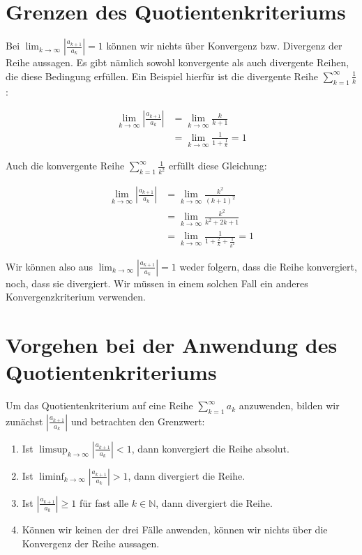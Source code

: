 \documentclass[fontsize=9pt,
               parskip=half-,
               DIV=14,
               listof=chapterentry,
               tocflat]{scrbook}
\begin{document}
\section{Grenzen des Quotientenkriteriums}

Bei $\lim _{k\to \infty }\left|{\tfrac {a_{k+1}}{a_{k}}}\right|=1$ können wir nichts über Konvergenz bzw. Divergenz der Reihe aussagen. Es gibt nämlich sowohl konvergente als auch divergente Reihen, die diese Bedingung erfüllen. Ein Beispiel hierfür ist die divergente Reihe $\sum _{k=1}^{\infty }{\frac {1}{k}}$:

\begin{align*}
\lim _{k\to \infty }\left|{\frac {a_{k+1}}{a_{k}}}\right|&=\lim _{k\to \infty }{\frac {k}{k+1}}\\[0.5em]&=\lim _{k\to \infty }{\frac {1}{1+{\frac {1}{k}}}}=1
\end{align*}

Auch die konvergente Reihe $\sum _{k=1}^{\infty }{\frac {1}{k^{2}}}$ erfüllt diese Gleichung:

\begin{align*}
\lim _{k\to \infty }\left|{\frac {a_{k+1}}{a_{k}}}\right|&=\lim _{k\to \infty }{\frac {k^{2}}{(k+1)^{2}}}\\[0.5em]&=\lim _{k\to \infty }{\frac {k^{2}}{k^{2}+2k+1}}\\[0.5em]&=\lim _{k\to \infty }{\frac {1}{1+{\frac {2}{k}}+{\frac {1}{k^{2}}}}}=1
\end{align*}

Wir können also aus $\lim _{k\to \infty }\left|{\tfrac {a_{k+1}}{a_{k}}}\right|=1$ weder folgern, dass die Reihe konvergiert, noch, dass sie divergiert. Wir müssen in einem solchen Fall ein anderes Konvergenzkriterium verwenden.

\section{Vorgehen bei der Anwendung des Quotientenkriteriums}

Um das Quotientenkriterium auf eine Reihe $\sum _{k=1}^{\infty }a_{k}$ anzuwenden, bilden wir zunächst $\left|{\tfrac {a_{k+1}}{a_{k}}}\right|$ und betrachten den Grenzwert:

\begin{enumerate}
\item Ist $\limsup _{k\to \infty }\left|{\tfrac {a_{k+1}}{a_{k}}}\right|<1$, dann konvergiert die Reihe absolut.
\item Ist $\liminf _{k\to \infty }\left|{\tfrac {a_{k+1}}{a_{k}}}\right|>1$, dann divergiert die Reihe.
\item Ist $\left|{\tfrac {a_{k+1}}{a_{k}}}\right|\geq 1$ für fast alle $k\in \mathbb {N} $, dann divergiert die Reihe.
\item Können wir keinen der drei Fälle anwenden, können wir nichts über die Konvergenz der Reihe aussagen.
\end{enumerate}
\end{document}
